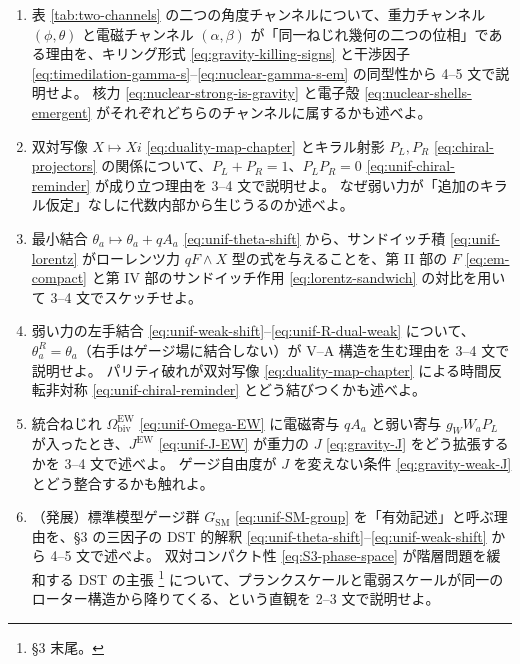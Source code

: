 \documentclass[dvipdfmx,a4paper,oneside]{jsbook}
\numberwithin{equation}{chapter}
\begin{document}
\begin{enumerate}[leftmargin=2em]
  \item 表 \ref{tab:two-channels} の二つの角度チャンネルについて、重力チャンネル \((\phi, \theta)\) と電磁チャンネル \((\alpha, \beta)\) が「同一ねじれ幾何の二つの位相」である理由を、キリング形式 \eqref{eq:gravity-killing-signs} と干渉因子 \eqref{eq:timedilation-gamma-s}–\eqref{eq:nuclear-gamma-s-em} の同型性から 4--5 文で説明せよ。
  核力 \eqref{eq:nuclear-strong-is-gravity} と電子殻 \eqref{eq:nuclear-shells-emergent} がそれぞれどちらのチャンネルに属するかも述べよ。

  \item 双対写像 \(X \mapsto Xi\) \eqref{eq:duality-map-chapter} とキラル射影 \(P_L, P_R\) \eqref{eq:chiral-projectors} の関係について、\(P_L + P_R = 1\)、\(P_L P_R = 0\) \eqref{eq:unif-chiral-reminder} が成り立つ理由を 3--4 文で説明せよ。
  なぜ弱い力が「追加のキラル仮定」なしに代数内部から生じうるのか述べよ。

  \item 最小結合 \(\theta_a \mapsto \theta_a + q A_a\) \eqref{eq:unif-theta-shift} から、サンドイッチ積 \eqref{eq:unif-lorentz} がローレンツ力 \(q F \wedge X\) 型の式を与えることを、第 II 部の \(F\) \eqref{eq:em-compact} と第 IV 部のサンドイッチ作用 \eqref{eq:lorentz-sandwich} の対比を用いて 3--4 文でスケッチせよ。

  \item 弱い力の左手結合 \eqref{eq:unif-weak-shift}–\eqref{eq:unif-R-dual-weak} について、\(\theta_a^{R} = \theta_a\)（右手はゲージ場に結合しない）が V--A 構造を生む理由を 3--4 文で説明せよ。
  パリティ破れが双対写像 \eqref{eq:duality-map-chapter} による時間反転非対称 \eqref{eq:unif-chiral-reminder} とどう結びつくかも述べよ。

  \item 統合ねじれ \(\Omega_{\mathrm{biv}}^{\mathrm{EW}}\) \eqref{eq:unif-Omega-EW} に電磁寄与 \(q A_a\) と弱い寄与 \(g_W W_a P_L\) が入ったとき、\(J^{\mathrm{EW}}\) \eqref{eq:unif-J-EW} が重力の \(J\) \eqref{eq:gravity-J} をどう拡張するかを 3--4 文で述べよ。
  ゲージ自由度が \(J\) を変えない条件 \eqref{eq:gravity-weak-J} とどう整合するかも触れよ。

  \item （発展）標準模型ゲージ群 \(G_{\mathrm{SM}}\) \eqref{eq:unif-SM-group} を「有効記述」と呼ぶ理由を、§3 の三因子の DST 的解釈 \eqref{eq:unif-theta-shift}–\eqref{eq:unif-weak-shift} から 4--5 文で述べよ。
  双対コンパクト性 \eqref{eq:S3-phase-space} が階層問題を緩和する DST の主張 \footnote{§3 末尾。} について、プランクスケールと電弱スケールが同一のローター構造から降りてくる、という直観を 2--3 文で説明せよ。
\end{enumerate}
\end{document}
